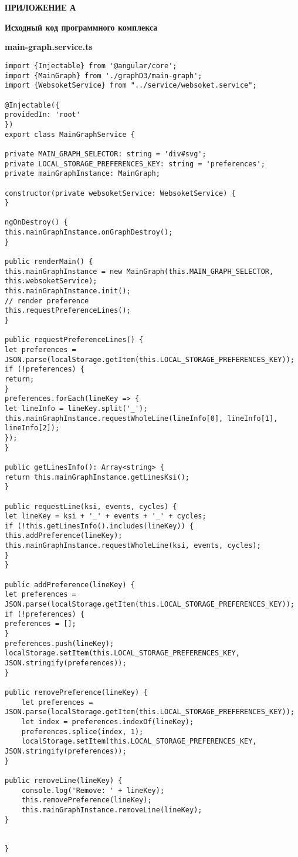 \chapter*{}
\begin{flushright}
	\textbf{ПРИЛОЖЕНИЕ А}
\end{flushright}
\begin{center}
	\textbf{Исходный код программного комплекса}
\end{center}

\textbf{main-graph.service.ts}

\begin{lstlisting}
import {Injectable} from '@angular/core';
import {MainGraph} from './graphD3/main-graph';
import {WebsoketService} from "../service/websoket.service";

@Injectable({
providedIn: 'root'
})
export class MainGraphService {

private MAIN_GRAPH_SELECTOR: string = 'div#svg';
private LOCAL_STORAGE_PREFERENCES_KEY: string = 'preferences';
private mainGraphInstance: MainGraph;

constructor(private websoketService: WebsoketService) {
}

ngOnDestroy() {
this.mainGraphInstance.onGraphDestroy();
}

public renderMain() {
this.mainGraphInstance = new MainGraph(this.MAIN_GRAPH_SELECTOR, this.websoketService);
this.mainGraphInstance.init();
// render preference
this.requestPreferenceLines();
}

public requestPreferenceLines() {
let preferences = JSON.parse(localStorage.getItem(this.LOCAL_STORAGE_PREFERENCES_KEY));
if (!preferences) {
return;
}
preferences.forEach(lineKey => {
let lineInfo = lineKey.split('_');
this.mainGraphInstance.requestWholeLine(lineInfo[0], lineInfo[1], lineInfo[2]);
});
}

public getLinesInfo(): Array<string> {
return this.mainGraphInstance.getLinesKsi();
}

public requestLine(ksi, events, cycles) {
let lineKey = ksi + '_' + events + '_' + cycles;
if (!this.getLinesInfo().includes(lineKey)) {
this.addPreference(lineKey);
this.mainGraphInstance.requestWholeLine(ksi, events, cycles);
}
}

public addPreference(lineKey) {
let preferences = JSON.parse(localStorage.getItem(this.LOCAL_STORAGE_PREFERENCES_KEY));
if (!preferences) {
preferences = [];
}
preferences.push(lineKey);
localStorage.setItem(this.LOCAL_STORAGE_PREFERENCES_KEY, JSON.stringify(preferences));
}

public removePreference(lineKey) {
	let preferences = JSON.parse(localStorage.getItem(this.LOCAL_STORAGE_PREFERENCES_KEY));
	let index = preferences.indexOf(lineKey);
	preferences.splice(index, 1);
	localStorage.setItem(this.LOCAL_STORAGE_PREFERENCES_KEY, JSON.stringify(preferences));
}

public removeLine(lineKey) {
	console.log('Remove: ' + lineKey);
	this.removePreference(lineKey);
	this.mainGraphInstance.removeLine(lineKey);
}


}
\end{lstlisting}